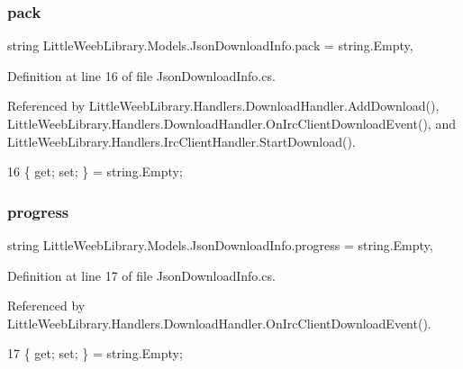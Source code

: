 \subsubsection{\texorpdfstring{pack}{pack}}
{\footnotesize\ttfamily string Little\+Weeb\+Library.\+Models.\+Json\+Download\+Info.\+pack = string.\+Empty\hspace{0.3cm}{\ttfamily [get]}, {\ttfamily [set]}}



Definition at line 16 of file Json\+Download\+Info.\+cs.



Referenced by Little\+Weeb\+Library.\+Handlers.\+Download\+Handler.\+Add\+Download(), Little\+Weeb\+Library.\+Handlers.\+Download\+Handler.\+On\+Irc\+Client\+Download\+Event(), and Little\+Weeb\+Library.\+Handlers.\+Irc\+Client\+Handler.\+Start\+Download().


\begin{DoxyCode}
16 \{ \textcolor{keyword}{get}; \textcolor{keyword}{set}; \} = \textcolor{keywordtype}{string}.Empty;
\end{DoxyCode}
\mbox{\label{class_little_weeb_library_1_1_models_1_1_json_download_info_a7ddc5b0dc7e617ed2cf665c2e5e5345a}} 
\subsubsection{\texorpdfstring{progress}{progress}}
{\footnotesize\ttfamily string Little\+Weeb\+Library.\+Models.\+Json\+Download\+Info.\+progress = string.\+Empty\hspace{0.3cm}{\ttfamily [get]}, {\ttfamily [set]}}



Definition at line 17 of file Json\+Download\+Info.\+cs.



Referenced by Little\+Weeb\+Library.\+Handlers.\+Download\+Handler.\+On\+Irc\+Client\+Download\+Event().


\begin{DoxyCode}
17 \{ \textcolor{keyword}{get}; \textcolor{keyword}{set}; \} = \textcolor{keywordtype}{string}.Empty;
\end{DoxyCode}
\mbox{\label{class_little_weeb_library_1_1_models_1_1_json_download_info_a1d05f9a1872baac04d0561b5d0b34cf1}} 
